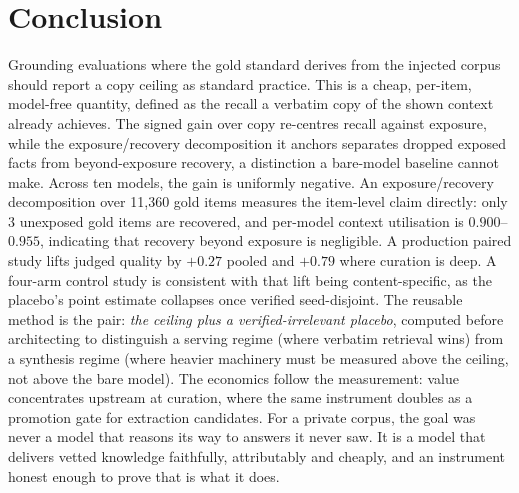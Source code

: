 \documentclass[10pt,twocolumn]{article}
\begin{document}
\section{Conclusion}\label{sec:conclusion}
Grounding evaluations where the gold standard derives from the injected corpus should report a copy ceiling as standard practice. This is a cheap, per-item, model-free quantity, defined as the recall a verbatim copy of the shown context already achieves. The signed gain over copy re-centres recall against exposure, while the exposure/recovery decomposition it anchors separates dropped exposed facts from beyond-exposure recovery, a distinction a bare-model baseline cannot make. Across ten models, the gain is uniformly negative. An exposure/recovery decomposition over 11{,}360 gold items measures the item-level claim directly: only 3 unexposed gold items are recovered, and per-model context utilisation is $0.900$--$0.955$, indicating that recovery beyond exposure is negligible. A production paired study lifts judged quality by $+0.27$ pooled and $+0.79$ where curation is deep. A four-arm control study is consistent with that lift being content-specific, as the placebo's point estimate collapses once verified seed-disjoint. The reusable method is the pair: \emph{the ceiling plus a verified-irrelevant placebo}, computed before architecting to distinguish a serving regime (where verbatim retrieval wins) from a synthesis regime (where heavier machinery must be measured above the ceiling, not above the bare model). The economics follow the measurement: value concentrates upstream at curation, where the same instrument doubles as a promotion gate for extraction candidates. For a private corpus, the goal was never a model that reasons its way to answers it never saw. It is a model that delivers vetted knowledge faithfully, attributably and cheaply, and an instrument honest enough to prove that is what it does.

\printbibliography
\end{document}
